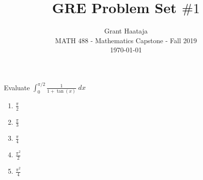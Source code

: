 \documentclass[letterpaper,12pt]{amsart}
\newenvironment{problem}[2][Problem]{\begin{trivlist}
\item[\hskip \labelsep {\bfseries #1}\hskip \labelsep {\bfseries #2.}]}{\end{trivlist}}
\begin{document}
 
 
 
\title{GRE Problem Set $\#1$}%
\author{Grant Haataja\\
MATH $488$ - Mathematics Capstone - Fall 2019\\
\today} 
 
\maketitle
 
\begin{problem}{6}
  Evaluate $\displaystyle \int_0^{\pi/2} \frac{1}{1+\tan(x)}\;dx$
  
   \vspace*{0.15cm}
  \begin{enumerate}[itemsep=0.15cm]
    \item $\frac{\pi}{2}$
    \item $\frac{\pi}{3}$
    \item $\frac{\pi}{4}$
    \item $\frac{\pi^2}{2}$
    \item $\frac{\pi^2}{4}$
   \end{enumerate}
\end{problem}
\vspace*{0.15cm}
\end{document}

